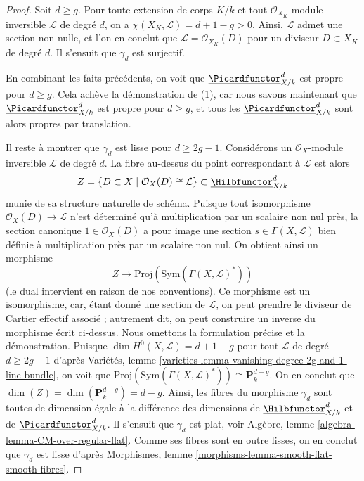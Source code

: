 \begin{proof}
\medskip\noindent
Soit $d \geq g$. Pour toute extension de corps $K/k$ et tout
$\mathcal{O}_{X_K}$-module inversible $\mathcal{L}$ de degré $d$, on a
$\chi(X_K, \mathcal{L}) = d + 1 - g > 0$. Ainsi, $\mathcal{L}$ admet une
section non nulle, et l'on en conclut que $\mathcal{L} = \mathcal{O}_{X_K}(D)$
pour un diviseur $D \subset X_K$ de degré $d$. Il s'ensuit que
$\gamma_d$ est surjectif.

\medskip\noindent
En combinant les faits précédents, on voit que
$\underline{\Picardfunctor}^d_{X/k}$ est propre pour $d \geq g$.
Cela achève la démonstration de (1), car nous savons maintenant que
$\underline{\Picardfunctor}^d_{X/k}$ est propre pour $d \geq g$, et
tous les $\underline{\Picardfunctor}^d_{X/k}$ sont alors propres par translation.

\medskip\noindent
Il reste à montrer que $\gamma_d$ est lisse pour $d \geq 2g - 1$.
Considérons un $\mathcal{O}_X$-module inversible $\mathcal{L}$ de degré
$d$. La fibre au-dessus du point correspondant à $\mathcal{L}$ est alors
$$
Z = \{D \subset X \mid \mathcal{O}_X(D) \cong \mathcal{L}\} \subset
\underline{\Hilbfunctor}^d_{X/k}
$$
munie de sa structure naturelle de schéma. Puisque tout isomorphisme
$\mathcal{O}_X(D) \to \mathcal{L}$ n'est déterminé qu'à
multiplication par un scalaire non nul près, la section canonique
$1 \in \mathcal{O}_X(D)$ a pour image une section
$s \in \Gamma(X, \mathcal{L})$ bien définie à multiplication
près par un scalaire non nul. On obtient ainsi un morphisme
$$
Z \longrightarrow
\text{Proj}(\text{Sym}(\Gamma(X, \mathcal{L})^*))
$$
(le dual intervient en raison de nos conventions). Ce morphisme est un isomorphisme,
car, étant donné une section de $\mathcal{L}$, on peut prendre le diviseur de Cartier
effectif associé ; autrement dit, on peut construire un inverse du
morphisme écrit ci-dessus. Nous omettons la formulation précise et la démonstration.
Puisque $\dim H^0(X, \mathcal{L}) = d + 1 - g$ pour tout
$\mathcal{L}$ de degré $d \geq 2g - 1$ d'après
Variétés, lemme \ref{varieties-lemma-vanishing-degree-2g-and-1-line-bundle},
on voit que $\text{Proj}(\text{Sym}(\Gamma(X, \mathcal{L})^*))
\cong \mathbf{P}^{d - g}_k$.
On en conclut que $\dim(Z) = \dim(\mathbf{P}^{d - g}_k) = d - g$.
Ainsi, les fibres du morphisme $\gamma_d$ sont toutes
de dimension égale à la différence des dimensions de
$\underline{\Hilbfunctor}^d_{X/k}$ et de $\underline{\Picardfunctor}^d_{X/k}$.
Il s'ensuit que $\gamma_d$ est plat, voir
Algèbre, lemme \ref{algebra-lemma-CM-over-regular-flat}.
Comme ses fibres sont en outre lisses, on en conclut que $\gamma_d$
est lisse d'après Morphismes, lemme \ref{morphisms-lemma-smooth-flat-smooth-fibres}.
\end{proof}





